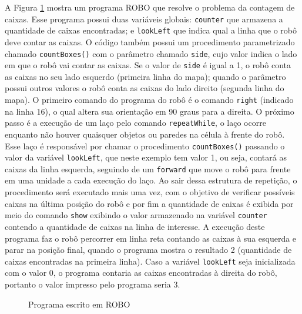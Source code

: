 A Figura \ref{fig:roboprogram} mostra um programa ROBO que resolve o problema da contagem de caixas. 
Esse programa possui duas variáveis globais: \texttt{counter} que armazena a quantidade de caixas encontradas; e \texttt{lookLeft} que indica qual a linha que o robô deve contar as caixas. O código também possui um procedimento parametrizado chamado \texttt{countBoxes()} com o parâmetro chamado \texttt{side}, cujo valor indica o lado em que o robô vai contar as caixas. Se o valor de \texttt{side} é igual a 1, o robô conta as caixas no seu lado esquerdo (primeira linha do mapa);  quando o parâmetro possui outros valores o robô conta as caixas do lado direito (segunda linha do mapa). O primeiro comando do programa do robô é o comando \texttt{right} (indicado na linha 16), o qual altera sua orientação em 90 graus para a direita. O próximo passo é a execução de um laço pelo comando \texttt{repeatWhile}, o laço ocorre enquanto não houver quaisquer objetos ou paredes na célula à frente do robô. Esse laço é responsável por chamar o procedimento \texttt{countBoxes()} passando o valor da variável \texttt{lookLeft}, que neste exemplo tem valor 1, ou seja, contará as caixas da linha esquerda, seguindo de um \texttt{forward} que move o robô para frente em uma unidade a cada execução do laço. Ao sair dessa estrutura de repetição, o procedimento será executado mais uma vez, com o objetivo de verificar possíveis caixas na última posição do robô e por fim a quantidade de caixas é exibida por meio do comando \texttt{show} exibindo o valor armazenado na variável \texttt{counter} contendo a quantidade de caixas na linha de interesse. 
A execução deste programa faz o robô percorrer em linha reta contando as caixas à sua esquerda e parar na posição final, quando o programa mostra o resultado 2 (quantidade de caixas encontradas na primeira linha). Caso a variável \texttt{lookLeft} seja inicializada com o valor 0, o programa contaria as caixas encontradas à direita do robô, portanto o valor impresso pelo programa seria 3. 

\begin{figure}[h]
\caption{Programa escrito em ROBO}

\label{fig:roboprogram}
\end{figure}


